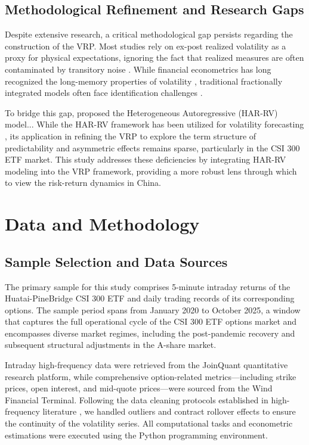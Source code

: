 \documentclass[a4paper, 12pt]{article}    %
\begin{document}
\subsection{Methodological Refinement and Research Gaps}
Despite extensive research, a critical methodological gap persists regarding the construction of the VRP. Most studies rely on ex-post realized volatility as a proxy for physical expectations, ignoring the fact that realized measures are often contaminated by transitory noise {\citep{andersen1998}}. While financial econometrics has long recognized the long-memory properties of volatility {\citep{engle1982arch}}, traditional fractionally integrated models often face identification challenges {\citep{li2022weak}}.

To bridge this gap, \cite{corsi2009} proposed the Heterogeneous Autoregressive (HAR-RV) model... While the HAR-RV framework has been utilized for volatility forecasting \citep{timmermann2018forecasting, huang2016modeling, hansen2010realizedgarch},  its application in refining the VRP to explore the term structure of predictability and asymmetric effects remains sparse, particularly in the CSI 300 ETF market. This study addresses these deficiencies by integrating HAR-RV modeling into the VRP framework, providing a more robust lens through which to view the risk-return dynamics in China.


\section{Data and Methodology}

\subsection{Sample Selection and Data Sources}
The primary sample for this study comprises 5-minute intraday returns of the Huatai-PineBridge CSI 300 ETF and daily trading records of its corresponding options. The sample period spans from January 2020 to October 2025, a window that captures the full operational cycle of the CSI 300 ETF options market and encompasses diverse market regimes, including the post-pandemic recovery and subsequent structural adjustments in the A-share market.

Intraday high-frequency data were retrieved from the JoinQuant quantitative research platform, while comprehensive option-related metrics—including strike prices, open interest, and mid-quote prices—were sourced from the Wind Financial Terminal. Following the data cleaning protocols established in high-frequency literature {\citep{andersen1998}}, we handled outliers and contract rollover effects to ensure the continuity of the volatility series. All computational tasks and econometric estimations were executed using the Python programming environment.
\end{document}
